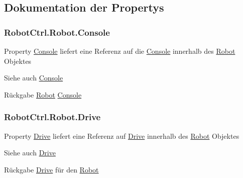 \subsection{Dokumentation der Propertys}
\hypertarget{class_robot_ctrl_1_1_robot_ae78d1691cc943383977741712962bf82}{
\subsubsection[{Console}]{ RobotCtrl.Robot.Console}}
\label{class_robot_ctrl_1_1_robot_ae78d1691cc943383977741712962bf82}
Property \hyperlink{class_robot_ctrl_1_1_console}{Console} liefert eine Referenz auf die \hyperlink{class_robot_ctrl_1_1_console}{Console} innerhalb des \hyperlink{class_robot_ctrl_1_1_robot}{Robot} Objektes \begin{DoxySeeAlso}{Siehe auch}
\hyperlink{class_robot_ctrl_1_1_console}{Console}
\end{DoxySeeAlso}
\begin{DoxyReturn}{Rückgabe}
\hyperlink{class_robot_ctrl_1_1_robot}{Robot} \hyperlink{class_robot_ctrl_1_1_console}{Console} 
\end{DoxyReturn}
\hypertarget{class_robot_ctrl_1_1_robot_a6e1e59f43f8578d78da6c6a19e55f269}{
\subsubsection[{Drive}]{ RobotCtrl.Robot.Drive}}
\label{class_robot_ctrl_1_1_robot_a6e1e59f43f8578d78da6c6a19e55f269}
Property \hyperlink{class_robot_ctrl_1_1_drive}{Drive} liefert eine Referenz auf \hyperlink{class_robot_ctrl_1_1_drive}{Drive} innerhalb des \hyperlink{class_robot_ctrl_1_1_robot}{Robot} Objektes \begin{DoxySeeAlso}{Siehe auch}
\hyperlink{class_robot_ctrl_1_1_drive}{Drive}
\end{DoxySeeAlso}
\begin{DoxyReturn}{Rückgabe}
\hyperlink{class_robot_ctrl_1_1_drive}{Drive} f\"{u}r den \hyperlink{class_robot_ctrl_1_1_robot}{Robot} 
\end{DoxyReturn}
